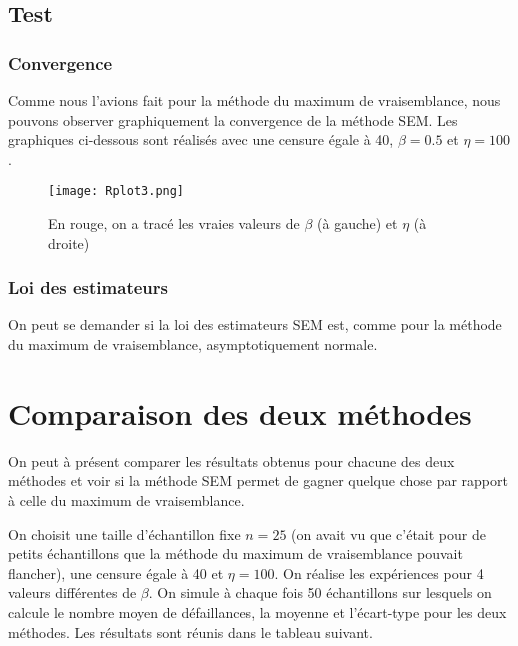 \documentclass[a4paper]{report}
\begin{document}
 \section{Test}
 
 \subsection{Convergence}
 
 Comme nous l'avions fait pour la méthode du maximum de vraisemblance, nous pouvons observer graphiquement la convergence de la méthode SEM. Les graphiques ci-dessous sont réalisés avec une censure égale à 40, $\beta=0.5$ et $\eta=100$.
 
\begin{figure}[!ht]
	\centering
     	\texttt{[image: Rplot3.png]}

	\caption{En rouge, on a tracé les vraies valeurs de $\beta$ (à gauche) et $\eta$ (à droite)}
\end{figure}  

 \subsection{Loi des estimateurs}
 
 On peut se demander si la loi des estimateurs SEM est, comme pour la méthode du maximum de vraisemblance, asymptotiquement normale. 
 
  
\chapter{Comparaison des deux méthodes}

 On peut à présent comparer les résultats obtenus pour chacune des deux méthodes et voir si la méthode SEM permet de gagner quelque chose par rapport à celle du maximum de vraisemblance. 
 
 On choisit une taille d'échantillon fixe $n=25$ (on avait vu que c'était pour de petits échantillons que la méthode du maximum de vraisemblance pouvait flancher), une censure égale à 40 et $\eta=100$. On réalise les expériences pour 4 valeurs différentes de $\beta$. On simule à chaque fois 50 échantillons sur lesquels on calcule le nombre moyen de défaillances, la moyenne et l'écart-type pour les deux méthodes. Les résultats sont réunis dans le tableau suivant.
 
\end{document}
